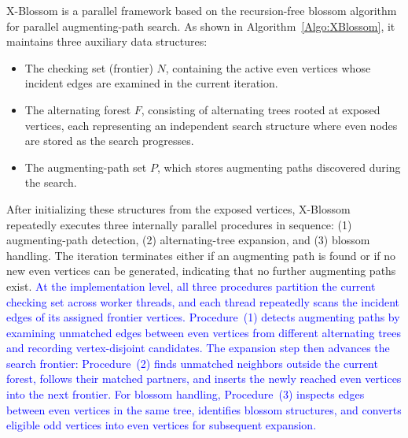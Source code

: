 X-Blossom is a parallel framework based on the recursion-free blossom algorithm for parallel augmenting-path search. As shown in Algorithm~\ref{Algo:XBlossom}, it maintains three auxiliary data structures:
\begin{itemize}[leftmargin=*]
    \item The checking set (frontier) $N$, containing the active even vertices whose incident edges are examined in the current iteration.
    \item The alternating forest $F$, consisting of alternating trees rooted at exposed vertices, each representing an independent search structure where even nodes are stored as the search progresses.
    \item The augmenting-path set $P$, which stores augmenting paths discovered during the search.
\end{itemize}

After initializing these structures from the exposed vertices, X-Blossom repeatedly executes three internally parallel procedures in sequence:  
(1) augmenting-path detection,  
(2) alternating-tree expansion, and  
(3) blossom handling.  
The iteration terminates either if an augmenting path is found or if no new even vertices can be generated, indicating that no further augmenting paths exist.
\label{para:xblossom-three-parallel-procedures}
\textcolor{blue}{At the implementation level, all three procedures partition the current checking set across worker threads, and each thread repeatedly scans the incident edges of its assigned frontier vertices.
Procedure~(1) detects augmenting paths by examining unmatched edges between even vertices from different alternating trees and recording vertex-disjoint candidates.
The expansion step then advances the search frontier: Procedure~(2) finds unmatched neighbors outside the current forest, follows their matched partners, and inserts the newly reached even vertices into the next frontier.
For blossom handling, Procedure~(3) inspects edges between even vertices in the same tree, identifies blossom structures, and converts eligible odd vertices into even vertices for subsequent expansion.}

